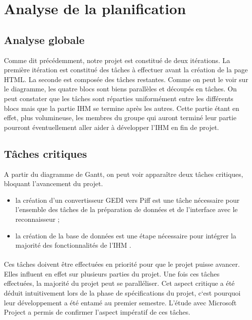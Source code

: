 \newpage

\section{Analyse de la planification}

\subsection{Analyse globale}

Comme dit précédemment, notre projet est constitué de deux itérations. La première itération est constitué des tâches à effectuer avant la création de la page HTML. La seconde est composée des tâches restantes. Comme on peut le voir sur le diagramme, les quatre blocs sont biens parallèles et découpés en tâches. On peut constater que les tâches sont réparties uniformément entre les différents blocs mais que la partie IHM se termine après les autres. Cette partie étant en effet, plus volumineuse, les membres du groupe qui auront terminé leur partie pourront éventuellement aller aider à développer l’IHM en fin  de projet.

\subsection{Tâches critiques}

A partir du diagramme de Gantt, on peut voir apparaître deux tâches critiques, bloquant l’avancement du projet.

\begin{itemize}
\item la création d’un convertisseur GEDI vers Piff est une tâche nécessaire pour l’ensemble des tâches de la préparation de données et de l’interface avec le reconnaisseur ;
\item la création de la base de données est une étape nécessaire pour intégrer la majorité des fonctionnalités de l’IHM .
\end{itemize}

\paragraph{}

Ces tâches doivent être effectuées en priorité pour que le projet puisse avancer. Elles influent en effet sur plusieurs parties du projet. Une fois ces tâches effectuées, la majorité du projet peut se paralléliser. Cet aspect critique a été déduit intuitivement lors de la phase de spécifications du projet, c‘est pourquoi leur développement a été entamé au premier semestre. L’étude avec Microsoft Project a permis de confirmer l’aspect impératif de ces tâches.

